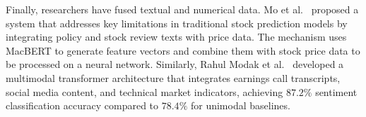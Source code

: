 Finally, researchers have fused textual and numerical data. Mo et al.\ \cite{mo2024mof} proposed a system that addresses key limitations in traditional stock prediction models by integrating policy and stock review texts with price data. The mechanism uses MacBERT to generate feature vectors and combine them with stock price data to be processed on a neural network. Similarly, Rahul Modak et al.\ \cite{Modak2023MarketSA} developed a multimodal transformer architecture that integrates earnings call transcripts, social media content, and technical market indicators, achieving $87.2\%$ sentiment classification accuracy compared to $78.4\%$ for unimodal baselines.

